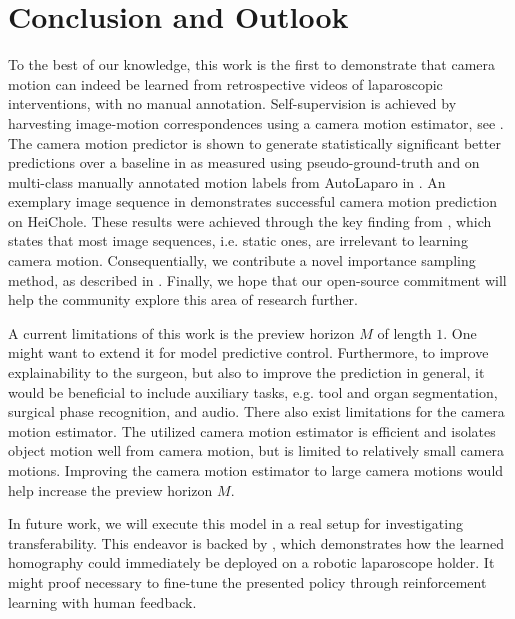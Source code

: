 \section{Conclusion and Outlook}
To the best of our knowledge, this work is the first
to demonstrate that camera motion can indeed be learned from 
retrospective
videos of laparoscopic interventions,
with no manual annotation.
Self-supervision is achieved 
by harvesting image-motion correspondences using a camera motion estimator, see . The camera motion predictor is shown to generate statistically significant better predictions over a baseline in  as measured using pseudo-ground-truth and on multi-class manually annotated motion labels from AutoLaparo in . An exemplary image sequence in  demonstrates successful camera motion prediction on HeiChole. These results were achieved through the key finding from , which states that most image sequences, i.e. static ones, are irrelevant to learning camera motion. Consequentially, we contribute a novel importance sampling method, as described in . Finally, we hope that our open-source commitment will help the community explore this area of research further.

A current limitations of this work is the preview horizon $M$ of length $1$. One might want to extend it for model predictive control. Furthermore, to improve explainability to the surgeon, but also to improve the prediction in general, it would be beneficial to include auxiliary tasks, e.g. tool and organ segmentation, surgical phase recognition, and audio. There also exist limitations for the camera motion estimator. The utilized camera motion estimator is efficient and isolates object motion well from camera motion, but is limited to relatively small camera motions. Improving the camera motion estimator to large camera motions would help increase the preview horizon $M$.

In future work, we will execute this model in a real setup for investigating transferability. This endeavor is backed by \cite{huber2021homographybased}, which demonstrates how the learned homography could immediately be deployed on a robotic laparoscope holder. It  might proof necessary to fine-tune the presented policy through reinforcement learning with human feedback.

